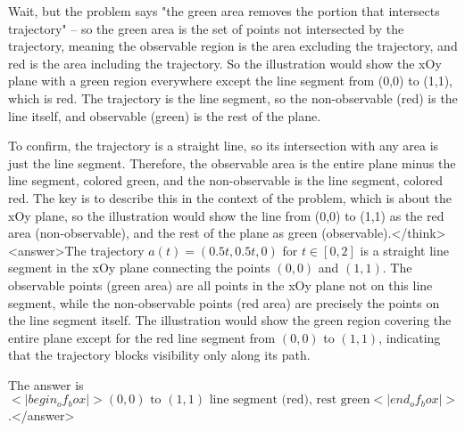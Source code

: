 Wait, but the problem says "the green area removes the portion that intersects trajectory" – so the green area is the set of points not intersected by the trajectory, meaning the observable region is the area excluding the trajectory, and red is the area including the trajectory. So the illustration would show the xOy plane with a green region everywhere except the line segment from (0,0) to (1,1), which is red. The trajectory is the line segment, so the non-observable (red) is the line itself, and observable (green) is the rest of the plane.

To confirm, the trajectory is a straight line, so its intersection with any area is just the line segment. Therefore, the observable area is the entire plane minus the line segment, colored green, and the non-observable is the line segment, colored red. The key is to describe this in the context of the problem, which is about the xOy plane, so the illustration would show the line from (0,0) to (1,1) as the red area (non-observable), and the rest of the plane as green (observable).</think><answer>The trajectory \( a(t) = (0.5t, 0.5t, 0) \) for \( t \in [0, 2] \) is a straight line segment in the xOy plane connecting the points \((0, 0)\) and \((1, 1)\). The observable points (green area) are all points in the xOy plane not on this line segment, while the non-observable points (red area) are precisely the points on the line segment itself. The illustration would show the green region covering the entire plane except for the red line segment from \((0, 0)\) to \((1, 1)\), indicating that the trajectory blocks visibility only along its path.  

The answer is \(<|begin_of_box|>(0,0) \text{ to } (1,1) \text{ line segment (red), rest green}<|end_of_box|>\).</answer>